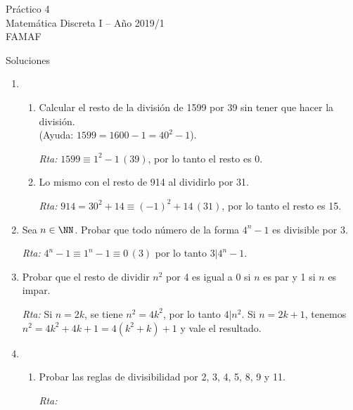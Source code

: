 \documentclass[12pt,spanish,makeidx]{amsbook}
\newcommand{\rta}{\noindent\textit{Rta: }}
\newcommand{\md}[1]{{\,}\left(#1\right)}
\begin{document}
{\bf \begin{center} Práctico 4 \\ Matemática Discreta I -- Año 2019/1 \\ FAMAF \end{center}}

{\bf \begin{center} Soluciones \end{center}}

\begin{enumerate}
	\item  
	\begin{enumerate}
		\item Calcular el resto de la división de 1599 por 39 sin tener que hacer la división. \\(Ayuda: $1599=1600-1=40^2-1$).
		
		\rta $1599\equiv 1^2-1\md{ 39}$, por lo tanto el resto es 0.
		
		\item Lo mismo con el resto de 914 al dividirlo por 31.
		
		\rta $914=30^2+14\equiv (-1)^2+14 \md{ 31}$, por lo tanto el resto es 15.
	\end{enumerate}
	
	
	\smallskip
	\item Sea $n\in\NN$. Probar que todo número de la forma $4^n-1$ es divisible por 3.
	
	\rta $4^n-1\equiv 1^n-1 \equiv 0 \md 3$ por lo tanto $3\vert 4^n-1$.
	
	\smallskip
	\item Probar que el resto de dividir $n^2$ por 4 es igual a 0 si $n$ es par y 1 si $n$ es impar.
		
	\rta  Si $n=2k$, se tiene $n^2=4k^2$, por lo tanto $4\vert n^2$. Si $n=2k+1$, tenemos $n^2=4k^2+4k+1=4(k^2+k)+1$ y vale el resultado.
	
	
	
	\smallskip
	\item
	\begin{enumerate}
		\item
		Probar las reglas de divisibilidad por 2, 3, 4, 5, 8, 9 y 11.%
			
		\rta 
		

\end{enumerate}
\end{enumerate}
\end{document}
